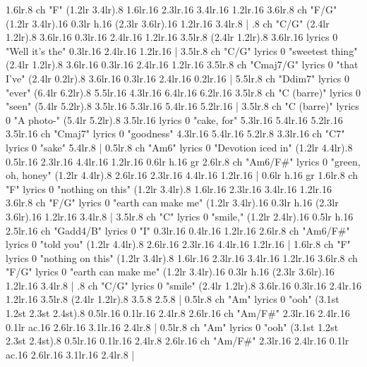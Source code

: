 1.6{lr}.8 {ch "F"} (1.2{lr} 3.4{lr}).8 1.6{lr}.16 2.3{lr}.16 3.4{lr}.16 1.2{lr}.16 3.6{lr}.8 {ch "F/G"} (1.2{lr} 3.4{lr}).16 0.3{lr h}.16 (2.3{lr} 3.6{lr}).16 1.2{lr}.16 3.4{lr}.8 |
.8 {ch "C/G"} (2.4{lr} 1.2{lr}).8 3.6{lr}.16 0.3{lr}.16 2.4{lr}.16 1.2{lr}.16 3.5{lr}.8 (2.4{lr} 1.2{lr}).8 3.6{lr}.16 {lyrics 0 "Well it's the"} 0.3{lr}.16 2.4{lr}.16 1.2{lr}.16 |
3.5{lr}.8 {ch "C/G" lyrics 0 "sweetest thing"} (2.4{lr} 1.2{lr}).8 3.6{lr}.16 0.3{lr}.16 2.4{lr}.16 1.2{lr}.16 3.5{lr}.8 {ch "Cmaj7/G" lyrics 0 "that I've"} (2.4{lr} 0.2{lr}).8 3.6{lr}.16 0.3{lr}.16 2.4{lr}.16 0.2{lr}.16 |
5.5{lr}.8 {ch "Ddim7" lyrics 0 "ever"} (6.4{lr} 6.2{lr}).8 5.5{lr}.16 4.3{lr}.16 6.4{lr}.16 6.2{lr}.16 3.5{lr}.8 {ch "C (barre)" lyrics 0 "seen"} (5.4{lr} 5.2{lr}).8 3.5{lr}.16 5.3{lr}.16 5.4{lr}.16 5.2{lr}.16 |
3.5{lr}.8 {ch "C (barre)" lyrics 0 "A photo-"} (5.4{lr} 5.2{lr}).8 3.5{lr}.16 {lyrics 0 "cake, for"} 5.3{lr}.16 5.4{lr}.16 5.2{lr}.16 3.5{lr}.16 {ch "Cmaj7" lyrics 0 "goodness"} 4.3{lr}.16 5.4{lr}.16 5.2{lr}.8 3.3{lr}.16 {ch "C7" lyrics 0 "sake"} 5.4{lr}.8 |
0.5{lr}.8 {ch "Am6" lyrics 0 "Devotion iced in"} (1.2{lr} 4.4{lr}).8 0.5{lr}.16 2.3{lr}.16 4.4{lr}.16 1.2{lr}.16 0.6{lr h}.16 {gr} 2.6{lr}.8 {ch "Am6/F#" lyrics 0 "green, oh, honey"} (1.2{lr} 4.4{lr}).8 2.6{lr}.16 2.3{lr}.16 4.4{lr}.16 1.2{lr}.16 |
0.6{lr h}.16 {gr} 1.6{lr}.8 {ch "F" lyrics 0 "nothing on this"} (1.2{lr} 3.4{lr}).8 1.6{lr}.16 2.3{lr}.16 3.4{lr}.16 1.2{lr}.16 3.6{lr}.8 {ch "F/G" lyrics 0 "earth can make me"} (1.2{lr} 3.4{lr}).16 0.3{lr h}.16 (2.3{lr} 3.6{lr}).16 1.2{lr}.16 3.4{lr}.8 |
3.5{lr}.8 {ch "C" lyrics 0 "smile,"} (1.2{lr} 2.4{lr}).16 0.5{lr h}.16 2.5{lr}.16 {ch "Gadd4/B" lyrics 0 "I"} 0.3{lr}.16 0.4{lr}.16 1.2{lr}.16 2.6{lr}.8 {ch "Am6/F#" lyrics 0 "told you"} (1.2{lr} 4.4{lr}).8 2.6{lr}.16 2.3{lr}.16 4.4{lr}.16 1.2{lr}.16 |
1.6{lr}.8 {ch "F" lyrics 0 "nothing on this"} (1.2{lr} 3.4{lr}).8 1.6{lr}.16 2.3{lr}.16 3.4{lr}.16 1.2{lr}.16 3.6{lr}.8 {ch "F/G" lyrics 0 "earth can make me"} (1.2{lr} 3.4{lr}).16 0.3{lr h}.16 (2.3{lr} 3.6{lr}).16 1.2{lr}.16 3.4{lr}.8 |
.8 {ch "C/G" lyrics 0 "smile"} (2.4{lr} 1.2{lr}).8 3.6{lr}.16 0.3{lr}.16 2.4{lr}.16 1.2{lr}.16 3.5{lr}.8 (2.4{lr} 1.2{lr}).8 3.5.8 2.5.8 |
0.5{lr}.8 {ch "Am" lyrics 0 "ooh"} (3.1{st} 1.2{st} 2.3{st} 2.4{st}).8 0.5{lr}.16 0.1{lr}.16 2.4{lr}.8 2.6{lr}.16 {ch "Am/F#"} 2.3{lr}.16 2.4{lr}.16 0.1{lr ac}.16 2.6{lr}.16 3.1{lr}.16 2.4{lr}.8 |
0.5{lr}.8 {ch "Am" lyrics 0 "ooh"} (3.1{st} 1.2{st} 2.3{st} 2.4{st}).8 0.5{lr}.16 0.1{lr}.16 2.4{lr}.8 2.6{lr}.16 {ch "Am/F#"} 2.3{lr}.16 2.4{lr}.16 0.1{lr ac}.16 2.6{lr}.16 3.1{lr}.16 2.4{lr}.8 |

